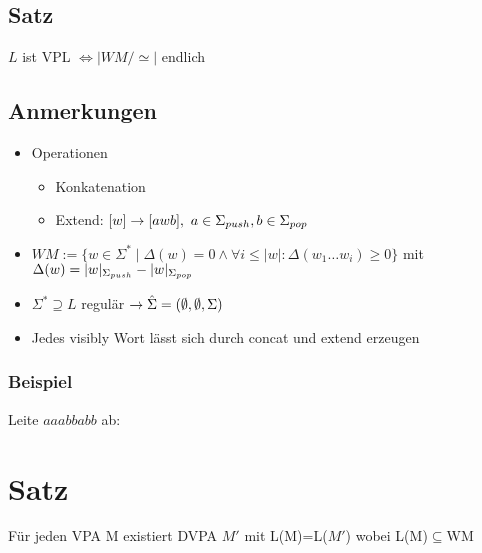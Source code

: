 \subsection{Satz}
    $L$ ist VPL $\Leftrightarrow |WM/\simeq |$ endlich
\subsection{Anmerkungen}
    \begin{itemize}
        \item Operationen
            \begin{itemize}
                \item Konkatenation
                \item Extend:
                \subitem $[w]\rightarrow [awb],\ a\in\Sigmapush,b\in\Sigmapop$
            \end{itemize}
        \item $WM:=\{w\in\Sigma^* \mid \Delta(w)=0\wedge \forall i\le|w|:\Delta(w_1\dots w_i)\geq 0\}$
        \subitem mit $\Delta(w)=|w|_{\Sigma_{push}}-|w|_{\Sigma_{pop}}$
        \item $\Sigma^* \supseteq L$ regulär $\rightarrow \hat{\Sigma}=(\emptyset,\emptyset,\Sigma)$
        \item Jedes visibly Wort lässt sich durch concat und extend erzeugen
    \end{itemize}
    \subsubsection{Beispiel}
    \vspace*{2cm}Leite $aaabbabb$ ab:\vspace*{-2.5cm}\\
        \hspace*{5cm}
\section{Satz}
    Für jeden VPA M existiert DVPA $M'$ mit L(M)=L($M'$) wobei L(M)$\subseteq$WM
